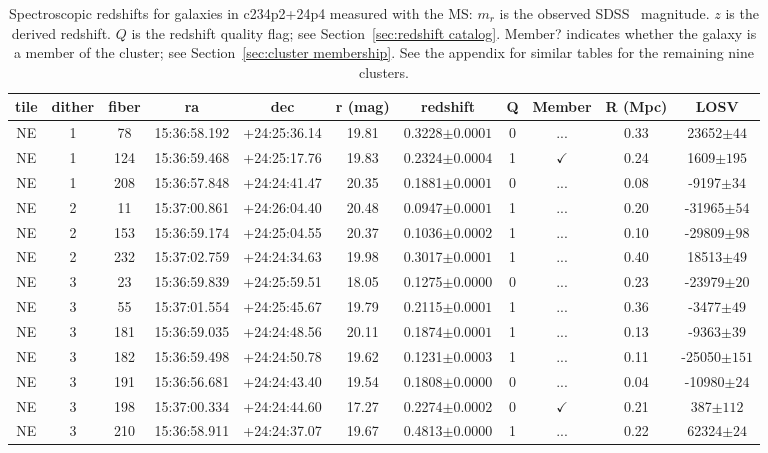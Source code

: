 \begin{table*}
	\centering \caption{Spectroscopic redshifts for galaxies in c234p2+24p4 measured with the MS: $m_r$ is the observed SDSS \sdssr\ magnitude. $z$ is the derived redshift. $Q$ is the redshift quality flag; see Section~\ref{sec:redshift catalog}. Member? indicates whether the galaxy is a member of the cluster; see Section~\ref{sec:cluster membership}. See the appendix for similar tables for the remaining nine clusters.}
	\begin{tabular}{ccccccccccc}
		\hline
		tile & dither & fiber & ra & dec & r (mag) & redshift & Q & Member & R (Mpc) & LOSV \\
		\hline \hline
		NE & 1 & 78 & 15:36:58.192 & +24:25:36.14 & 19.81 & 0.3228$\pm{0.0001}$ & 0 & ... & 0.33 & 23652$\pm{44}$ \\
		NE & 1 & 124 & 15:36:59.468 & +24:25:17.76 & 19.83 & 0.2324$\pm{0.0004}$ & 1 & $\checkmark$ & 0.24 & 1609$\pm{195}$ \\
		NE & 1 & 208 & 15:36:57.848 & +24:24:41.47 & 20.35 & 0.1881$\pm{0.0001}$ & 0 & ... & 0.08 & -9197$\pm{34}$ \\
		NE & 2 & 11 & 15:37:00.861 & +24:26:04.40 & 20.48 & 0.0947$\pm{0.0001}$ & 1 & ... & 0.20 & -31965$\pm{54}$ \\
		NE & 2 & 153 & 15:36:59.174 & +24:25:04.55 & 20.37 & 0.1036$\pm{0.0002}$ & 1 & ... & 0.10 & -29809$\pm{98}$ \\
		NE & 2 & 232 & 15:37:02.759 & +24:24:34.63 & 19.98 & 0.3017$\pm{0.0001}$ & 1 & ... & 0.40 & 18513$\pm{49}$ \\
		NE & 3 & 23 & 15:36:59.839 & +24:25:59.51 & 18.05 & 0.1275$\pm{0.0000}$ & 0 & ... & 0.23 & -23979$\pm{20}$ \\
		NE & 3 & 55 & 15:37:01.554 & +24:25:45.67 & 19.79 & 0.2115$\pm{0.0001}$ & 1 & ... & 0.36 & -3477$\pm{49}$ \\
		NE & 3 & 181 & 15:36:59.035 & +24:24:48.56 & 20.11 & 0.1874$\pm{0.0001}$ & 1 & ... & 0.13 & -9363$\pm{39}$ \\
		NE & 3 & 182 & 15:36:59.498 & +24:24:50.78 & 19.62 & 0.1231$\pm{0.0003}$ & 1 & ... & 0.11 & -25050$\pm{151}$ \\
		NE & 3 & 191 & 15:36:56.681 & +24:24:43.40 & 19.54 & 0.1808$\pm{0.0000}$ & 0 & ... & 0.04 & -10980$\pm{24}$ \\
		NE & 3 & 198 & 15:37:00.334 & +24:24:44.60 & 17.27 & 0.2274$\pm{0.0002}$ & 0 & $\checkmark$ & 0.21 & 387$\pm{112}$ \\
		NE & 3 & 210 & 15:36:58.911 & +24:24:37.07 & 19.67 & 0.4813$\pm{0.0000}$ & 1 & ... & 0.22 & 62324$\pm{24}$ \\

\end{tabular}
\end{table*}
